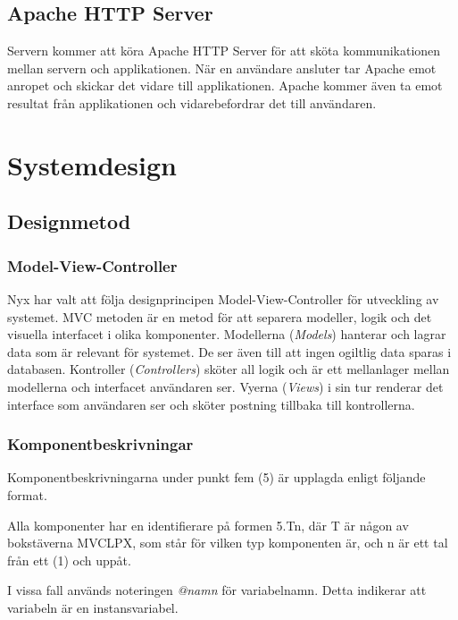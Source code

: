 \documentclass[a4paper, twoside, 11pt, titlepage]{article}
\begin{document}
	\subsection{Apache HTTP Server}


	Servern kommer att köra Apache HTTP Server för att sköta kommunikationen mellan servern och applikationen. När en användare ansluter tar Apache emot anropet och skickar det vidare till applikationen. Apache kommer även ta emot resultat från applikationen och vidarebefordrar det till användaren.

\clearpage
\section{Systemdesign}



	\subsection{Designmetod}



		\subsubsection{Model-View-Controller}


		Nyx har valt att följa designprincipen Model-View-Controller för utveckling av systemet. MVC metoden är en metod för att separera modeller, logik och det visuella interfacet i olika komponenter. Modellerna (\emph{Models}) hanterar och lagrar data som är relevant för systemet. De ser även till att ingen ogiltlig data sparas i databasen. Kontroller (\emph{Controllers}) sköter all logik och är ett mellanlager mellan modellerna och interfacet användaren ser. Vyerna (\emph{Views}) i sin tur renderar det interface som användaren ser och sköter postning tillbaka till kontrollerna.

		\subsubsection{Komponentbeskrivningar}


		Komponentbeskrivningarna under punkt fem (5) är upplagda enligt följande format.

		Alla komponenter har en identifierare på formen 5.Tn, där T är någon av bokstäverna MVCLPX, som står för vilken typ komponenten är, och n är ett tal från ett (1) och uppåt.

		I vissa fall används noteringen \emph{@namn} för variabelnamn. Detta indikerar att variabeln är en instansvariabel.
\end{document}
